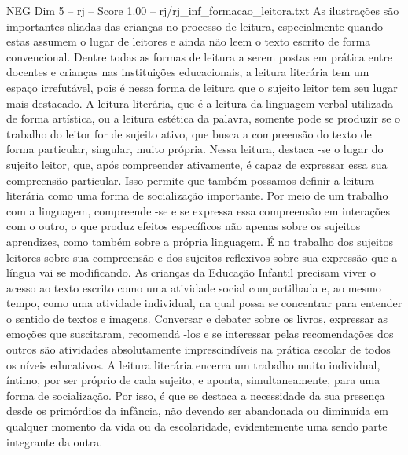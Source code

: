 \begin{textsample}{NEG Dim 5 – rj – Score 1.00 – rj/rj\_inf\_formacao\_leitora.txt}
As ilustrações são importantes aliadas das crianças no processo de leitura, especialmente quando estas assumem o lugar de leitores e ainda não leem o texto escrito de forma convencional.
Dentre todas as formas de leitura a serem postas em prática entre docentes e crianças nas instituições educacionais, a leitura literária tem um espaço irrefutável, pois é nessa forma de leitura que o sujeito leitor tem seu lugar mais destacado.
A leitura literária, que é a leitura da linguagem verbal utilizada de forma artística, ou a leitura estética da palavra, somente pode se produzir se o trabalho do leitor for de sujeito ativo, que busca a compreensão do texto de forma particular, singular, muito própria.
Nessa leitura, destaca -se o lugar do sujeito leitor, que, após compreender ativamente, é capaz de expressar essa sua compreensão particular.
Isso permite que também possamos definir a leitura literária como uma forma de socialização importante.
Por meio de um trabalho com a linguagem, compreende -se e se expressa essa compreensão em interações com o outro, o que produz efeitos específicos não apenas sobre os sujeitos aprendizes, como também sobre a própria linguagem.
É no trabalho dos sujeitos leitores sobre sua compreensão e dos sujeitos reflexivos sobre sua expressão que a língua vai se modificando.
As crianças da Educação Infantil precisam viver o acesso ao texto escrito como uma atividade social compartilhada e, ao mesmo tempo, como uma atividade individual, na qual possa se concentrar para entender o sentido de textos e imagens.
Conversar e debater sobre os livros, expressar as emoções que suscitaram, recomendá -los e se interessar pelas recomendações dos outros são atividades absolutamente imprescindíveis na prática escolar de todos os níveis educativos.
A leitura literária encerra um trabalho muito individual, íntimo, por ser próprio de cada sujeito, e aponta, simultaneamente, para uma forma de socialização.
Por isso, é que se destaca a necessidade da sua presença desde os primórdios da infância, não devendo ser abandonada ou diminuída em qualquer momento da vida ou da escolaridade, evidentemente uma sendo parte integrante da outra.

\end{textsample}
